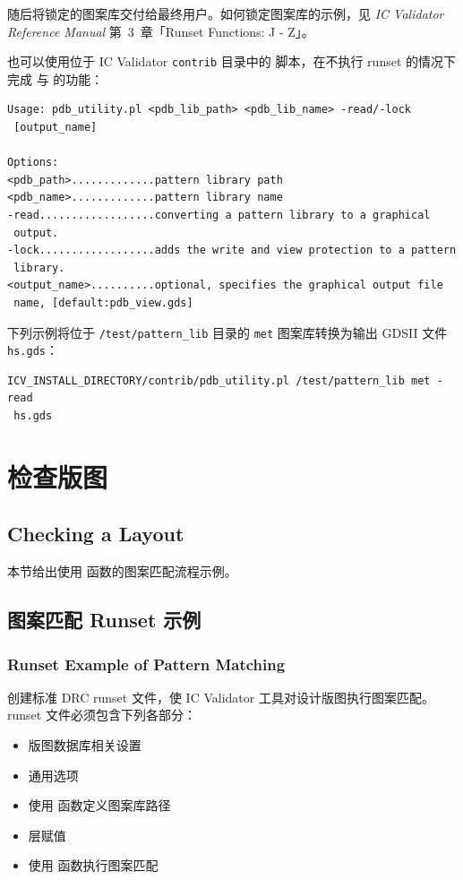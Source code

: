 随后将锁定的图案库交付给最终用户。如何锁定图案库的示例，见 \textit{IC Validator Reference Manual} 第~3~章「Runset Functions: J - Z」。

也可以使用位于 IC Validator \texttt{contrib} 目录中的  脚本，在不执行 runset 的情况下完成  与  的功能：
\begin{lstlisting}[style=shell]
Usage: pdb_utility.pl <pdb_lib_path> <pdb_lib_name> -read/-lock
 [output_name]

Options:
<pdb_path>.............pattern library path
<pdb_name>.............pattern library name
-read..................converting a pattern library to a graphical
 output.
-lock..................adds the write and view protection to a pattern
 library.
<output_name>..........optional, specifies the graphical output file
 name, [default:pdb_view.gds]
\end{lstlisting}

下列示例将位于 \texttt{/test/pattern\_lib} 目录的 \texttt{met} 图案库转换为输出 GDSII 文件 \texttt{hs.gds}：
\begin{lstlisting}[style=shell]
ICV_INSTALL_DIRECTORY/contrib/pdb_utility.pl /test/pattern_lib met -read
 hs.gds
\end{lstlisting}

\section{检查版图}
\subsection*{Checking a Layout}

本节给出使用  函数的图案匹配流程示例。

\subsection{图案匹配 Runset 示例}
\subsubsection*{Runset Example of Pattern Matching}

创建标准 DRC runset 文件，使 IC Validator 工具对设计版图执行图案匹配。runset 文件必须包含下列各部分：
\begin{itemize}
  \item 版图数据库相关设置
  \item 通用选项
  \item 使用  函数定义图案库路径
  \item 层赋值
  \item 使用  函数执行图案匹配
\end{itemize}

